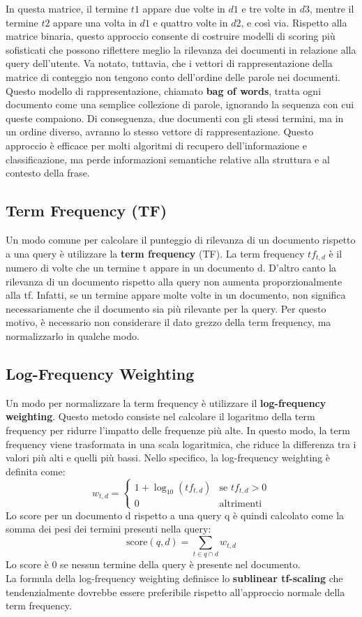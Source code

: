 \documentclass{report}
\begin{document}
	In questa matrice, il termine \( t1 \) appare due volte in \( d1 \) e tre volte in \( d3 \), mentre il termine \( t2 \) appare una volta in \( d1 \) e quattro volte in \( d2 \), e così via. Rispetto alla matrice binaria, questo approccio consente di costruire modelli di scoring più sofisticati che possono riflettere meglio la rilevanza dei documenti in relazione alla query dell'utente.
	Va notato, tuttavia, che i vettori di rappresentazione della matrice di conteggio non tengono conto dell'ordine delle parole nei documenti. Questo modello di rappresentazione, chiamato \textbf{bag of words}, tratta ogni documento come una semplice collezione di parole, ignorando la sequenza con cui queste compaiono. Di conseguenza, due documenti con gli stessi termini, ma in un ordine diverso, avranno lo stesso vettore di rappresentazione. Questo approccio è efficace per molti algoritmi di recupero dell'informazione e classificazione, ma perde informazioni semantiche relative alla struttura e al contesto della frase.

	\subsection{Term Frequency (TF)}
	Un modo comune per calcolare il punteggio di rilevanza di un documento rispetto a una query è utilizzare la \textbf{term frequency} (TF). La term frequency $tf_{t,d}$ è il numero di volte che un termine t appare in un documento d. D'altro canto la rilevanza di un documento rispetto alla query non aumenta proporzionalmente alla tf. Infatti, se un termine appare molte volte in un documento, non significa necessariamente che il documento sia più rilevante per la query. Per questo motivo, è necessario non considerare il dato grezzo della term frequency, ma normalizzarlo in qualche modo. 

	\subsection{Log-Frequency Weighting}
	Un modo per normalizzare la term frequency è utilizzare il \textbf{log-frequency weighting}. Questo metodo consiste nel calcolare il logaritmo della term frequency per ridurre l'impatto delle frequenze più alte. In questo modo, la term frequency viene trasformata in una scala logaritmica, che riduce la differenza tra i valori più alti e quelli più bassi. Nello specifico, la log-frequency weighting è definita come:
	\[
	w_{t,d} = \begin{cases}
		1 + \log_{10}(tf_{t,d}) & \text{se } tf_{t,d} > 0 \\
		0 & \text{altrimenti}
	\end{cases}
	\]
	Lo score per un documento d rispetto a una query q è quindi calcolato come la somma dei pesi dei termini presenti nella query:
	\[
	\text{score}(q,d) = \sum_{t \in q \cap d} w_{t,d}
	\]
	Lo score è 0 se nessun termine della query è presente nel documento.
	\vspace{\baselineskip}\\
	La formula della log-frequency weighting definisce lo \textbf{sublinear tf-scaling} che tendenzialmente dovrebbe essere preferibile rispetto all'approccio normale della term frequency.
\end{document}
